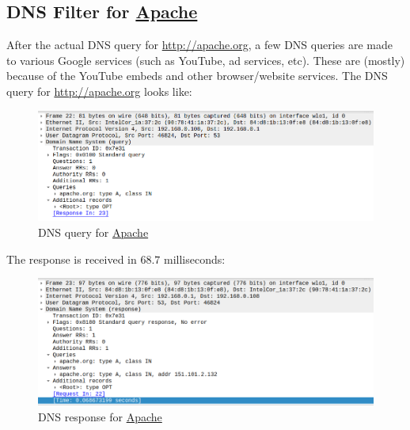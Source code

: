 \documentclass[11pt]{article}
\begin{document}
\subsection{DNS Filter for \href{http://apache.org}{Apache}}
After the actual DNS query for \url{http://apache.org}, a few DNS queries are made to various Google services (such as YouTube, ad services, etc). These are (mostly) because of the YouTube embeds and other browser/website services. The DNS query for \url{http://apache.org} looks like:
\begin{figure}[H]
    \centering
    \includegraphics[width=\textwidth]{apache_dns_query}
    \caption{DNS query for \href{http://apache.org}{Apache}}
\end{figure}

The response is received in $68.7$ milliseconds:
\begin{figure}[H]
    \centering
    \includegraphics[width=\textwidth]{apache_dns_response}
    \caption{DNS response for \href{http://apache.org}{Apache}}
\end{figure}
\end{document}
